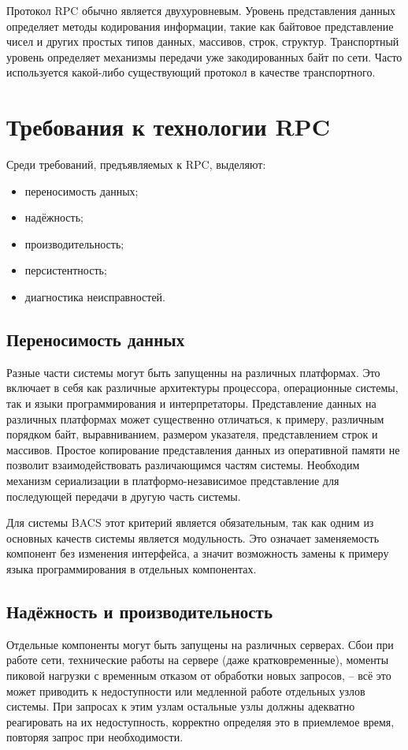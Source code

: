 Протокол RPC обычно является двухуровневым.
Уровень представления данных определяет методы кодирования информации,
такие как байтовое представление чисел и других простых типов данных,
массивов, строк, структур.
Транспортный уровень определяет механизмы передачи уже закодированных байт
по сети. Часто используется какой-либо существующий протокол в качестве
транспортного.

\section{Требования к технологии RPC}
Среди требований, предъявляемых к RPC, выделяют:
\begin{itemize}
    \item переносимость данных;
    \item надёжность;
    \item производительность;
    \item персистентность;
    \item диагностика неисправностей.
\end{itemize}

\subsection{Переносимость данных}
Разные части системы могут быть запущенны на различных платформах.
Это включает в себя как различные архитектуры процессора, операционные системы,
так и языки программирования и интерпретаторы. Представление данных на различных
платформах может существенно отличаться, к примеру, различным порядком байт,
выравниванием, размером указателя, представлением строк и массивов. Простое
копирование представления данных из оперативной памяти не позволит
взаимодействовать различающимся частям системы. Необходим механизм сериализации
в платформо-независимое представление для последующей передачи в другую часть
системы.

Для системы BACS этот критерий является обязательным, так как одним из основных
качеств системы является модульность. Это означает заменяемость компонент
без изменения интерфейса, а значит возможность замены к примеру языка
программирования в отдельных компонентах.

\subsection{Надёжность и производительность}
Отдельные компоненты могут быть запущены на различных серверах. Сбои при работе
сети, технические работы на сервере (даже кратковременные), моменты пиковой
нагрузки с временным отказом от обработки новых запросов, – всё это может
приводить к недоступности или медленной работе отдельных узлов системы.
При запросах к этим узлам остальные узлы должны адекватно реагировать на их
недоступность, корректно определяя это в приемлемое время, повторяя запрос
при необходимости.

